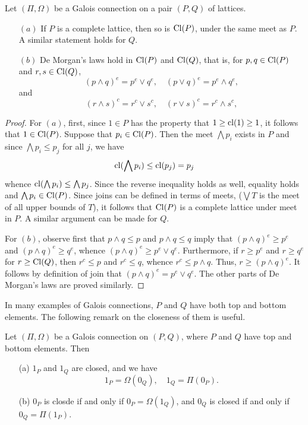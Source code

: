 \begin{theorem}\label{Galois connection on complete lattice}
Let $(\Pi,\Omega)$ be a Galois connection on a pair $(P,Q)$ of lattices.
\begin{itemize}
\item[$(a)$] If $P$ is a complete lattice, then so is $\mathrm{Cl}(P)$, under the same meet as $P$. A similar statement holds for $Q$.
\item[$(b)$] De Morgan's laws hold in $\mathrm{Cl}(P)$ and $\mathrm{Cl}(Q)$, that is, for $p,q\in \mathrm{Cl}(P)$ and $r,s\in\mathrm{Cl}(Q)$,
\[(p\wedge q)^e=p^e\vee q^e,\quad (p\vee q)^e=p^e\wedge q^e,\]
and
\[(r\wedge s)^c=r^c\vee s^c,\quad (r\vee s)^c=r^c\wedge s^c,\] 
\end{itemize}
\end{theorem}
\begin{proof}
For $(a)$, first, since $1\in P$ has the property that $1\geq\mathrm{cl}(1)\geq 1$, it follows that $1\in\mathrm{Cl}(P)$. Suppose that $p_i\in\mathrm{Cl}(P)$. Then the meet $\bigwedge p_i$ exists in $P$ and since $\bigwedge p_i\leq p_j$ for all $j$, we have
\[\mathrm{cl}(\bigwedge p_i)\leq\mathrm{cl}(p_j)=p_j\]
whence $\mathrm{cl}(\bigwedge p_i)\leq\bigwedge p_j$. Since the reverse inequality holds as well, equality holds and $\bigwedge p_i\in\mathrm{Cl}(P)$. Since joins can be defined in terms of meets, ($\bigvee T$ is the meet of all upper bounds of $T$), it follows that $\mathrm{Cl}(P)$ is a complete lattice under meet in $P$. A similar argument can be made for $Q$.\par
For $(b)$, observe first that $p\wedge q\leq p$ and $p\wedge q\leq q$ imply that $(p\wedge q)^e\geq p^e$ and $(p\wedge q)^e\geq q^e$, whence $(p\wedge q)^e\geq p^e\vee q^e$. Furthermore, if $r\geq p^e$ and $r\geq q^e$ for $r\geq\mathrm{Cl}(Q)$, then $r^c\leq p$ and $r^c\leq q$, whence $r^c\leq p\wedge q$. Thus, $r\geq(p\wedge q)^e$. It follows by definition of join that $(p\wedge q)^e=p^e\vee q^e$. The other parts of De Morgan's laws are proved similarly.
\end{proof}
In many examples of Galois connections, $P$ and $Q$ have both top and bottom elements. The following remark on the closeness of them is useful.
\begin{proposition}\label{Galois connection closedness of top and bottom}
Let $(\Pi,\Omega)$ be a Galois connection on $(P,Q)$, where $P$ and $Q$ have top and bottom elements. Then
\begin{itemize}
\item[(a)] $1_P$ and $1_Q$ are closed, and we have
\[1_P=\Omega(0_Q),\quad 1_Q=\Pi(0_P).\]
\item[(b)] $0_P$ is closde if and only if $0_P=\Omega(1_Q)$, and $0_Q$ is closed if and only if $0_Q=\Pi(1_P)$.
\end{itemize}
\end{proposition}

